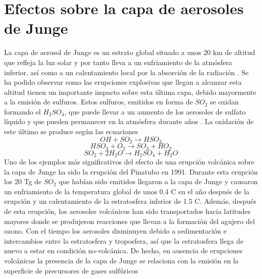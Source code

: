 \documentclass[a4apaper,twocolumn,10pt]{article}
\begin{document}
\section{Efectos sobre la capa de aerosoles de Junge}
La capa de aerosol de Junge es un estrato global situado a unos 20 km de altitud que refleja la luz solar y por tanto lleva a un enfriamiento de la atm\'osfera inferior, as\'i como a un calentamiento local por la absorci\'on de la radiaci\'on \cite{von2009effects}. Se ha podido observar como las erupciones explosivas que llegan a alcanzar esta altitud tienen un importante impacto sobre esta \'ultima capa, debido mayormente a la emisi\'on de sulfuros. Estos sulfuros, emitidos en forma de $SO_{2}$ se oxidan formando el $H_{2}SO_{4}$, que puede llevar a un aumento de los aerosoles de sulfato l\'iquido y que pueden permanecer en la atmósfera durante años
\cite{vernier2011major}. La oxidaci\'on de este \'ultimo se produce seg\'un las ecuaciones 
\begin{displaymath}
OH+SO_{2}\rightarrow HSO_{3}
\end{displaymath}
\begin{displaymath}
HSO_{3}+O_{2}\rightarrow SO_{3}+HO_{2}
\end{displaymath}
\begin{displaymath}
SO_{2}+2H_{2}O\rightarrow H_{2}SO_{4}+H_{2}O
\end{displaymath}
Uno de los ejemplos m\'as significativos del efecto de una erupci\'on volcánica sobre la
capa de Junge ha sido la erupci\'on del Pinatubo en 1991. Durante esta erupci\'on los 20 Tg de $SO_{2}$ que hab\'ian sido emitidos llegaron a la capa de Junge y causaron un enfriamiento de la
temperatura global de unos 0.4 \textdegree C en el a\~no después de la erupci\'on y un calentamiento de la estratosfera inferior de 1.5 \textdegree C. Además, después de esta erupci\'on, los aerosoles volc\'anicos han sido transportados hacia latitudes mayores donde se produjeron reacciones que llevan a la formaci\'on del agujero del ozono. Con el tiempo los aerosoles disminuyen debido a
sedimentaci\'on e intercambios entre la estratosfera y troposfera, as\'i que la estratosfera llega de nuevo a estar en condici\'on no-volc\'anica. De hecho, en ausencia de erupciones volc\'anicas la presencia de la capa de Junge se relaciona con la emisi\'on en la superficie de precursores de gases sulf\'uricos
\end{document}
